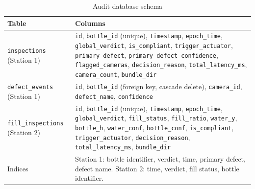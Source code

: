 \begin{table}[htbp]
\centering
\caption{Audit database schema}
\label{tab:schema}
\begin{tabularx}{\textwidth}{|L{3.4cm}|X|}
\hline
\textbf{Table} & \textbf{Columns} \\ \hline
\texttt{inspections} (Station 1) & \texttt{id}, \texttt{bottle\_id} (unique), \texttt{timestamp}, \texttt{epoch\_time}, \texttt{global\_verdict}, \texttt{is\_compliant}, \texttt{trigger\_actuator}, \texttt{primary\_defect}, \texttt{primary\_defect\_confidence}, \texttt{flagged\_cameras}, \texttt{decision\_reason}, \texttt{total\_latency\_ms}, \texttt{camera\_count}, \texttt{bundle\_dir} \\ \hline
\texttt{defect\_events} (Station 1) & \texttt{id}, \texttt{bottle\_id} (foreign key, cascade delete), \texttt{camera\_id}, \texttt{defect\_name}, \texttt{confidence} \\ \hline
\texttt{fill\_inspections} (Station 2) & \texttt{id}, \texttt{bottle\_id} (unique), \texttt{timestamp}, \texttt{epoch\_time}, \texttt{global\_verdict}, \texttt{fill\_status}, \texttt{fill\_ratio}, \texttt{water\_y}, \texttt{bottle\_h}, \texttt{water\_conf}, \texttt{bottle\_conf}, \texttt{is\_compliant}, \texttt{trigger\_actuator}, \texttt{decision\_reason}, \texttt{total\_latency\_ms}, \texttt{bundle\_dir} \\ \hline
Indices & Station 1: bottle identifier, verdict, time, primary defect, defect name. Station 2: time, verdict, fill status, bottle identifier. \\ \hline
\end{tabularx}
\end{table}


